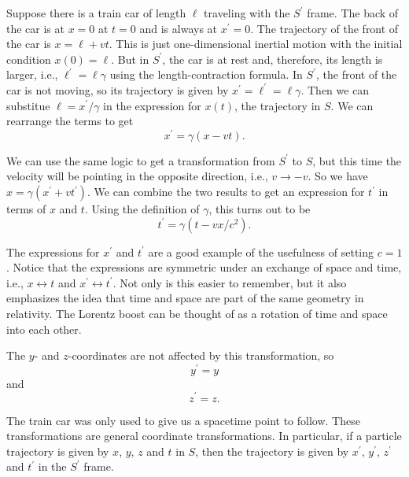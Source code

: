 \documentclass{article}
\begin{document}
Suppose there is a train car of length $\ell$ traveling with the $S^\prime$ frame. The back of the car is at $x = 0$ at $t = 0$ and is always at $x^\prime = 0$. The trajectory of the front of the car is $x = \ell + v t$. This is just one-dimensional inertial motion with the initial condition $x(0) = \ell$. But in $S^\prime$, the car is at rest and, therefore, its length is larger, i.e., $\ell^\prime = \ell \gamma$ using the length-contraction formula. In $S^\prime$, the front of the car is not moving, so its trajectory is given by $x^\prime = \ell^\prime = \ell \gamma$. Then we can substitue $\ell = x^\prime / \gamma$ in the expression for $x(t)$, the trajectory in $S$. We can rearrange the terms to get \begin{equation} x^\prime = \gamma ( x - v t ) . \end{equation}

We can use the same logic to get a transformation from $S^\prime$ to $S$, but this time the velocity will be pointing in the opposite direction, i.e., $v \to - v$. So we have $x = \gamma ( x^\prime + v t^\prime )$. We can combine the two results to get an expression for $t^\prime$ in terms of $x$ and $t$. Using the definition of $\gamma$, this turns out to be \begin{equation} t^\prime = \gamma ( t - v x/c^2 ) . \end{equation} 

The expressions for $x^\prime$ and $t^\prime$ are a good example of the usefulness of setting $c = 1$. Notice that the expressions are symmetric under an exchange of space and time, i.e., $x \leftrightarrow t$ and $x^\prime \leftrightarrow t^\prime$. Not only is this easier to remember, but it also emphasizes the idea that time and space are part of the same geometry in relativity. The Lorentz boost can be thought of as a rotation of time and space into each other.

The $y$- and $z$-coordinates are not affected by this transformation, so \begin{equation} y^\prime = y \end{equation} and \begin{equation} z^\prime = z . \end{equation}

The train car was only used to give us a spacetime point to follow. These transformations are general coordinate transformations. In particular, if a particle trajectory is given by $x$, $y$, $z$ and $t$ in $S$, then the trajectory is given by $x^\prime$, $y^\prime$, $z^\prime$ and $t^\prime$ in the $S^\prime$ frame.
\end{document}
